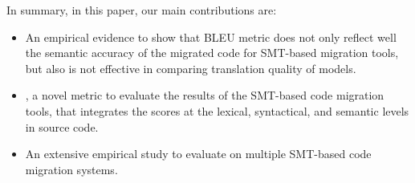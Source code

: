 
In summary, in this paper, our main contributions are:

\begin{itemize}
	\item An empirical evidence to show that BLEU metric does not only reflect
well the semantic accuracy of the migrated code for SMT-based
migration tools, but also is not effective in comparing translation 
quality of models.

	\item {\model}, a novel metric to evaluate the results of the SMT-based
code migration tools, that integrates the scores at the lexical,
syntactical, and semantic levels in source code.

	\item An extensive empirical study to evaluate {\model} on multiple SMT-based code migration systems. 
\end{itemize}







